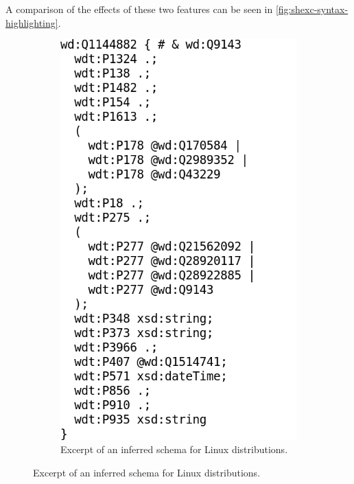 A comparison of the effects of these two features
can be seen in \cref{fig:shexc-syntax-highlighting}.

\begin{figure}[t]
  \begin{subfigure}[t]{0.45\textwidth}
    \centering
    \includegraphics[trim={0 2.5cm 0 0},clip]{screenshots/shexc-no-syntax-highlighting}
    \caption{
      Excerpt of an inferred schema for Linux distributions.
    }
    \label{fig:shexc-syntax-highlighting-without}
  \end{subfigure}

\end{figure}
